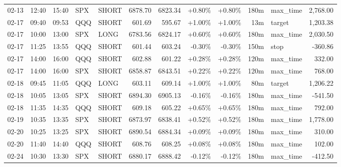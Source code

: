 \documentclass[11pt,a4paper,twoside]{article}
\begin{document}
\begin{center}
\begin{longtable}{>{\color{txtmain}}l l l l l r r r r r >{\color{txtmain}}l r}
02-13 & 12:40 & 15:40 & SPX & SHORT & 6878.70 & 6823.34 & \textcolor{wingreen}{+0.80\%} & \textcolor{wingreen}{+0.80\%} & 180m & max\_time & \textcolor{wingreen}{2,768.00} \\
02-17 & 09:40 & 09:53 & QQQ & SHORT & 601.69 & 595.67 & \textcolor{wingreen}{+1.00\%} & \textcolor{wingreen}{+1.00\%} & 13m & target & \textcolor{wingreen}{1,203.38} \\
02-17 & 10:00 & 13:00 & SPX & LONG & 6783.56 & 6824.17 & \textcolor{wingreen}{+0.60\%} & \textcolor{wingreen}{+0.60\%} & 180m & max\_time & \textcolor{wingreen}{2,030.50} \\
02-17 & 11:25 & 13:55 & QQQ & SHORT & 601.44 & 603.24 & \textcolor{lossred}{-0.30\%} & \textcolor{lossred}{-0.30\%} & 150m & stop & \textcolor{lossred}{-360.86} \\
02-17 & 14:00 & 16:00 & QQQ & SHORT & 602.88 & 601.22 & \textcolor{wingreen}{+0.28\%} & \textcolor{wingreen}{+0.28\%} & 120m & max\_time & \textcolor{wingreen}{332.00} \\
02-17 & 14:00 & 16:00 & SPX & SHORT & 6858.87 & 6843.51 & \textcolor{wingreen}{+0.22\%} & \textcolor{wingreen}{+0.22\%} & 120m & max\_time & \textcolor{wingreen}{768.00} \\
02-18 & 09:45 & 11:05 & QQQ & LONG & 603.11 & 609.14 & \textcolor{wingreen}{+1.00\%} & \textcolor{wingreen}{+1.00\%} & 80m & target & \textcolor{wingreen}{1,206.22} \\
02-18 & 10:05 & 13:05 & SPX & SHORT & 6894.30 & 6905.13 & \textcolor{lossred}{-0.16\%} & \textcolor{lossred}{-0.16\%} & 180m & max\_time & \textcolor{lossred}{-541.50} \\
02-18 & 11:35 & 14:35 & QQQ & SHORT & 609.18 & 605.22 & \textcolor{wingreen}{+0.65\%} & \textcolor{wingreen}{+0.65\%} & 180m & max\_time & \textcolor{wingreen}{792.00} \\
02-19 & 10:35 & 13:35 & SPX & SHORT & 6873.97 & 6838.41 & \textcolor{wingreen}{+0.52\%} & \textcolor{wingreen}{+0.52\%} & 180m & max\_time & \textcolor{wingreen}{1,778.00} \\
02-20 & 10:25 & 13:25 & SPX & SHORT & 6890.54 & 6884.34 & \textcolor{wingreen}{+0.09\%} & \textcolor{wingreen}{+0.09\%} & 180m & max\_time & \textcolor{wingreen}{310.00} \\
02-20 & 11:40 & 14:40 & QQQ & SHORT & 608.76 & 608.25 & \textcolor{wingreen}{+0.08\%} & \textcolor{wingreen}{+0.08\%} & 180m & max\_time & \textcolor{wingreen}{102.00} \\
02-24 & 10:30 & 13:30 & SPX & SHORT & 6880.17 & 6888.42 & \textcolor{lossred}{-0.12\%} & \textcolor{lossred}{-0.12\%} & 180m & max\_time & \textcolor{lossred}{-412.50} \\

\end{longtable}
\end{center}
\end{document}
